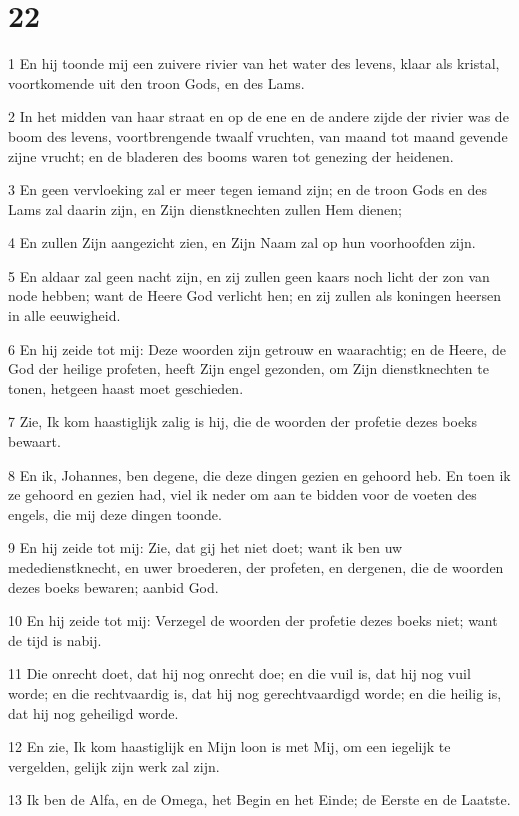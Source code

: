 \chapter{22}

\par 1 En hij toonde mij een zuivere rivier van het water des levens, klaar als kristal, voortkomende uit den troon Gods, en des Lams.
\par 2 In het midden van haar straat en op de ene en de andere zijde der rivier was de boom des levens, voortbrengende twaalf vruchten, van maand tot maand gevende zijne vrucht; en de bladeren des booms waren tot genezing der heidenen.
\par 3 En geen vervloeking zal er meer tegen iemand zijn; en de troon Gods en des Lams zal daarin zijn, en Zijn dienstknechten zullen Hem dienen;
\par 4 En zullen Zijn aangezicht zien, en Zijn Naam zal op hun voorhoofden zijn.
\par 5 En aldaar zal geen nacht zijn, en zij zullen geen kaars noch licht der zon van node hebben; want de Heere God verlicht hen; en zij zullen als koningen heersen in alle eeuwigheid.
\par 6 En hij zeide tot mij: Deze woorden zijn getrouw en waarachtig; en de Heere, de God der heilige profeten, heeft Zijn engel gezonden, om Zijn dienstknechten te tonen, hetgeen haast moet geschieden.
\par 7 Zie, Ik kom haastiglijk zalig is hij, die de woorden der profetie dezes boeks bewaart.
\par 8 En ik, Johannes, ben degene, die deze dingen gezien en gehoord heb. En toen ik ze gehoord en gezien had, viel ik neder om aan te bidden voor de voeten des engels, die mij deze dingen toonde.
\par 9 En hij zeide tot mij: Zie, dat gij het niet doet; want ik ben uw mededienstknecht, en uwer broederen, der profeten, en dergenen, die de woorden dezes boeks bewaren; aanbid God.
\par 10 En hij zeide tot mij: Verzegel de woorden der profetie dezes boeks niet; want de tijd is nabij.
\par 11 Die onrecht doet, dat hij nog onrecht doe; en die vuil is, dat hij nog vuil worde; en die rechtvaardig is, dat hij nog gerechtvaardigd worde; en die heilig is, dat hij nog geheiligd worde.
\par 12 En zie, Ik kom haastiglijk en Mijn loon is met Mij, om een iegelijk te vergelden, gelijk zijn werk zal zijn.
\par 13 Ik ben de Alfa, en de Omega, het Begin en het Einde; de Eerste en de Laatste.
